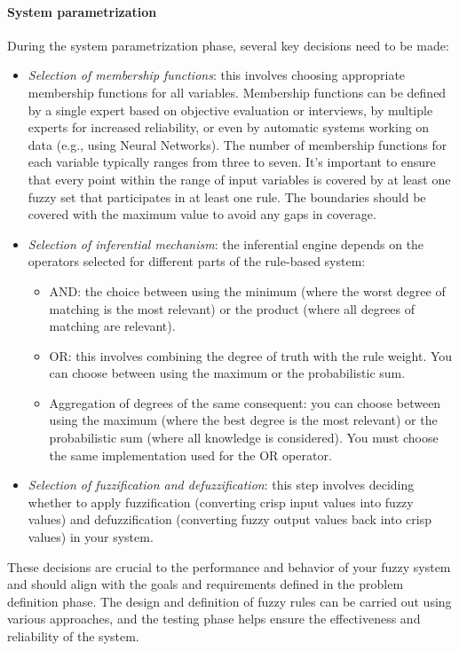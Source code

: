 \paragraph*{System parametrization}
During the system parametrization phase, several key decisions need to be made:
\begin{itemize}
    \item \textit{Selection of membership functions}: this involves choosing appropriate membership functions for all variables. 
        Membership functions can be defined by a single expert based on objective evaluation or interviews, by multiple experts for increased reliability, or even by automatic systems working on data (e.g., using Neural Networks). 
        The number of membership functions for each variable typically ranges from three to seven. 
        It's important to ensure that every point within the range of input variables is covered by at least one fuzzy set that participates in at least one rule. 
        The boundaries should be covered with the maximum value to avoid any gaps in coverage.
    \item \textit{Selection of inferential mechanism}: the inferential engine depends on the operators selected for different parts of the rule-based system:
        \begin{itemize}
            \item AND: the choice between using the minimum (where the worst degree of matching is the most relevant) or the product (where all degrees of matching are relevant).
            \item OR: this involves combining the degree of truth with the rule weight. 
                You can choose between using the maximum or the probabilistic sum.
            \item Aggregation of degrees of the same consequent: you can choose between using the maximum (where the best degree is the most relevant) or the probabilistic sum (where all knowledge is considered).
                You must choose the same implementation used for the OR operator. 
        \end{itemize}
    \item \textit{Selection of fuzzification and defuzzification}: this step involves deciding whether to apply fuzzification (converting crisp input values into fuzzy values) and defuzzification (converting fuzzy output values back into crisp values) in your system.
\end{itemize}
These decisions are crucial to the performance and behavior of your fuzzy system and should align with the goals and requirements defined in the problem definition phase.
The design and definition of fuzzy rules can be carried out using various approaches, and the testing phase helps ensure the effectiveness and reliability of the system. 

